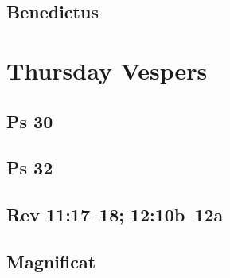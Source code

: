 {%
\parindent 0pt
\noindent
\ifx\preLilyPondExample \undefined
\else
  \expandafter\preLilyPondExample
\fi
\def\lilypondbook{}%

\ifx\postLilyPondExample \undefined
\else
  \expandafter\postLilyPondExample
\fi
}

\subsection{Benedictus}

{%
\parindent 0pt
\noindent
\ifx\preLilyPondExample \undefined
\else
  \expandafter\preLilyPondExample
\fi
\def\lilypondbook{}%

\ifx\postLilyPondExample \undefined
\else
  \expandafter\postLilyPondExample
\fi
}


\section{Thursday Vespers}

\subsection{Ps 30}

{%
\parindent 0pt
\noindent
\ifx\preLilyPondExample \undefined
\else
  \expandafter\preLilyPondExample
\fi
\def\lilypondbook{}%

\ifx\postLilyPondExample \undefined
\else
  \expandafter\postLilyPondExample
\fi
}

\subsection{Ps 32}

{%
\parindent 0pt
\noindent
\ifx\preLilyPondExample \undefined
\else
  \expandafter\preLilyPondExample
\fi
\def\lilypondbook{}%

\ifx\postLilyPondExample \undefined
\else
  \expandafter\postLilyPondExample
\fi
}

\subsection{Rev 11:17--18; 12:10b--12a}

{%
\parindent 0pt
\noindent
\ifx\preLilyPondExample \undefined
\else
  \expandafter\preLilyPondExample
\fi
\def\lilypondbook{}%

\ifx\postLilyPondExample \undefined
\else
  \expandafter\postLilyPondExample
\fi
}

\subsection{Magnificat}

